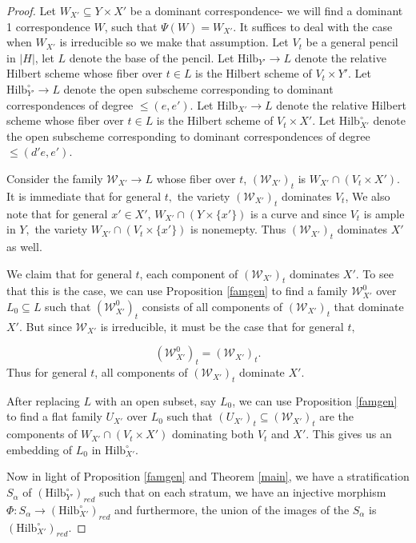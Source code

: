 \documentclass[10pt,a4paper]{amsart}
\newcommand{\Hilb}{\mathrm{Hilb}}
\begin{document}
\begin{proof}
    Let $W_{X'} \subseteq Y \times X'$ be a dominant correspondence- we will find a dominant 1 correspondence $W$, such that $\Psi(W) = W_{X'}$.  It suffices to deal with the case when $W_{X'}$ is irreducible so we make that assumption.
Let $V_t$  be a general pencil in $|H|$, let $L$ denote the base of the pencil. Let $\Hilb_{Y'} \to L$ denote the relative Hilbert scheme whose fiber over $t \in L$ is the Hilbert scheme of $V_t \times Y'$. Let $\Hilb^{\circ}_{Y'} \to L$ denote the open subscheme corresponding to dominant correspondences of degree $\le (e,e')$. 
Let $\Hilb_{X'} \to L$ denote the relative Hilbert scheme whose fiber over $t \in L$ is the Hilbert scheme of $V_t \times X'$. Let $\Hilb^{\circ}_{X'}$ denote the open subscheme corresponding to dominant correspondences of  degree $\le (d' e ,e')$.

Consider the family $\mathcal{W}_{X'} \to L$ whose fiber over $t$, $(\mathcal{W}_{X'})_t$ is   $W_{X'} \cap (V_t \times {X'})$. It is immediate that for general $t, $ the variety $(\mathcal{W}_{X'})_t$ dominates $V_t$, We also note that for general $x' \in X'$,  $W_{X'} \cap (Y \times \{x'\})$ is a curve and since $V_t$ is ample in $Y, $ the variety $W_{X'} \cap (V_t \times \{x'\})$ is nonemepty. Thus $(\mathcal{W}_{X'})_t$ dominates $X'$ as well.

We claim that for general $t$, each component of $(\mathcal{W}_{X'})_t$ dominates  $X'$. To see that this is the case,  we can use Proposition \ref{famgen} to find a family $\mathcal{W}^0_{X'}$ over $L_0 \subseteq L$ such that $({\mathcal{W}^0_{X'}})_t$ consists of all components of $({\mathcal{W}_{X'}})_t$ that dominate $X'$. But since $\mathcal{W}_{X'}$ is irreducible, it must be the case that for general $t,$ 

$$({\mathcal{W}^0_{X'}})_t = ({\mathcal{W}_{X'}})_t.$$
Thus for general $t$, all components of $({\mathcal{W}_{X'}})_t$ dominate $X'$. 

After replacing $L$ with an open subset, say $L_0$, we can use Proposition \ref{famgen} to find a flat family $U_{X'}$ over $L_0$ such that $(U_{X'})_t \subseteq ({\mathcal{W}_{X'}})_t $ are the components of $W_{X'} \cap (V_t \times X')$ dominating both $V_t$ and $X'$. This gives us an embedding of $L_0$ in $\Hilb^{\circ} _{X'}$.





Now in light of Proposition \ref{famgen} and Theorem \ref{main}, we have a stratification $S_{\alpha}$ of $(\Hilb^{\circ}_{Y'})_{red}$ such that on each stratum, we have an injective morphism $\Phi: S_{\alpha} \to (\Hilb^{\circ}_{X'})_{red}$ and furthermore, the union of the images of the $S_{\alpha}$ is $(\Hilb^{\circ}_{X'})_{red}$.



\end{proof}
\end{document}
